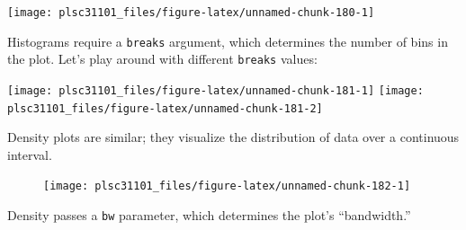 \documentclass[]{book}
\newenvironment{Shaded}{\begin{snugshade}}{\end{snugshade}}
\newcommand{\KeywordTok}[1]{\textcolor[rgb]{0.13,0.29,0.53}{\textbf{#1}}}
\newcommand{\DataTypeTok}[1]{\textcolor[rgb]{0.13,0.29,0.53}{#1}}
\newcommand{\DecValTok}[1]{\textcolor[rgb]{0.00,0.00,0.81}{#1}}
\newcommand{\StringTok}[1]{\textcolor[rgb]{0.31,0.60,0.02}{#1}}
\newcommand{\CommentTok}[1]{\textcolor[rgb]{0.56,0.35,0.01}{\textit{#1}}}
\newcommand{\OperatorTok}[1]{\textcolor[rgb]{0.81,0.36,0.00}{\textbf{#1}}}
\newcommand{\AlertTok}[1]{\textcolor[rgb]{0.94,0.16,0.16}{#1}}
\newcommand{\NormalTok}[1]{#1}
\begin{document}
\begin{center}\texttt{[image: plsc31101\_files/figure-latex/unnamed-chunk-180-1]} \end{center}

Histograms require a \texttt{breaks} argument, which determines the
number of bins in the plot. Let's play around with different
\texttt{breaks} values:

\begin{Shaded}
\end{Shaded}

\begin{center}\texttt{[image: plsc31101\_files/figure-latex/unnamed-chunk-181-1]} \texttt{[image: plsc31101\_files/figure-latex/unnamed-chunk-181-2]} \end{center}

Density plots are similar; they visualize the distribution of data over
a continuous interval.

\begin{Shaded}
\end{Shaded}

\begin{figure}

{\centering \texttt{[image: plsc31101\_files/figure-latex/unnamed-chunk-182-1]} 

}

\caption{ }\label{fig:unnamed-chunk-182}
\end{figure}

Density passes a \texttt{bw} parameter, which determines the plot's
``bandwidth.''
\end{document}
